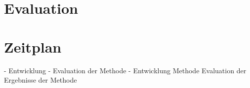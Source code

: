 \section{Evaluation}\label{sec:Expose:Evaluation}


\section{Zeitplan}\label{sec:Expose:Zeitplan}


- Entwicklung
- Evaluation der Methode
- Entwicklung Methode Evaluation der Ergebnisse der Methode